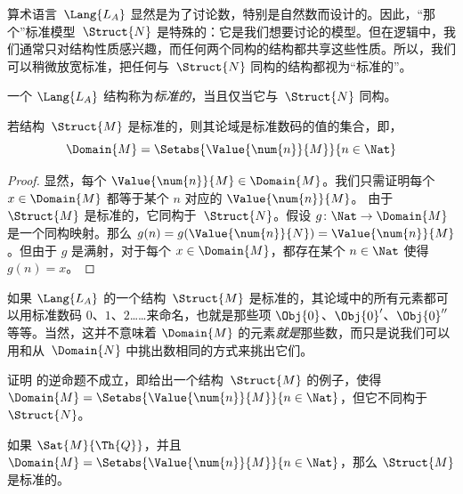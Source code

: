 \documentclass[../../../include/open-logic-section]{subfiles}
\begin{document}

算术语言~$\Lang{L_A}$ 显然是为了讨论数，特别是自然数而设计的。因此，“那个”标准模型~$\Struct{N}$ 是特殊的：它是我们想要讨论的模型。但在逻辑中，我们通常只对结构性质感兴趣，而任何两个同构的结构都共享这些性质。所以，我们可以稍微放宽标准，把任何与~$\Struct{N}$ 同构的结构都视为“标准的”。

\begin{defn}
一个 $\Lang{L_A}$ 结构称为\emph{标准的}，当且仅当它与~$\Struct{N}$ 同构。
\end{defn}

\begin{prop}
 若结构~$\Struct{M}$ 是标准的，则其论域是标准数码的值的集合，即，
\[
\Domain{M} = \Setabs{\Value{\num{n}}{M}}{n \in \Nat}
\]
\end{prop}

\begin{proof}
显然，每个 $\Value{\num{n}}{M} \in \Domain{M}$。我们只需证明每个 $x \in \Domain{M}$ 都等于某个 $n$ 对应的 $\Value{\num{n}}{M}$。
由于 $\Struct{M}$ 是标准的，它同构于~$\Struct{N}$。假设 $g\colon \Nat \to \Domain{M}$ 是一个同构映射。那么 $g(n) = g(\Value{\num{n}}{N}) =
\Value{\num{n}}{M}$。但由于 $g$ 是满射，对于每个 $x \in \Domain{M}$，都存在某个 $n \in \Nat$ 使得 $g(n) = x$。
\end{proof}

\begin{explain}
如果 $\Lang{L_A}$ 的一个结构~$\Struct{M}$ 是标准的，其论域中的所有元素都可以用标准数码 $\num{0}$、$\num{1}$、$\num{2}$……来命名，也就是那些项 $\Obj{0}$、$\Obj{0}'$、$\Obj{0}''$ 等等。当然，这并不意味着 $\Domain{M}$ 的元素\emph{就是}那些数，而只是说我们可以用和从~$\Domain{N}$ 中挑出数相同的方式来挑出它们。
\end{explain}

\begin{prob}
证明  的逆命题不成立，即给出一个结构~$\Struct{M}$ 的例子，使得 $\Domain{M} = \Setabs{\Value{\num{n}}{M}}{n \in \Nat}$，但它不同构于~$\Struct{N}$。
\end{prob}

\begin{prop}
如果 $\Sat{M}{\Th{Q}}$，并且 $\Domain{M} = \Setabs{\Value{\num{n}}{M}}{n
  \in \Nat}$，那么 $\Struct{M}$ 是标准的。
\end{prop}
\end{document}
